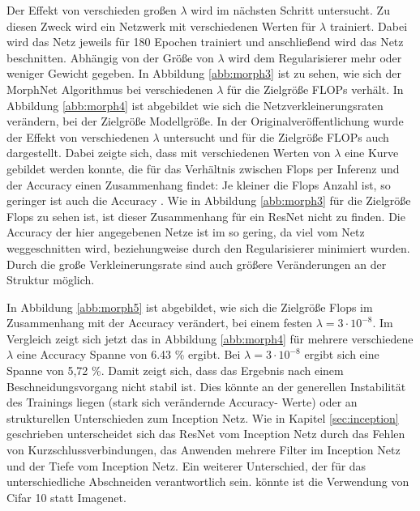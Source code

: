 Der Effekt von verschieden großen $\lambda$ wird im nächsten Schritt untersucht. Zu diesen Zweck wird ein Netzwerk mit verschiedenen Werten für $\lambda$ trainiert. Dabei wird das Netz jeweils für 180 Epochen trainiert und anschließend wird das Netz beschnitten. Abhängig von der Größe von $\lambda$ wird dem Regularisierer mehr oder weniger Gewicht gegeben. In Abbildung \ref{abb:morph3} ist zu sehen, wie sich der MorphNet Algorithmus bei verschiedenen $\lambda$ für die Zielgröße FLOPs verhält. In Abbildung \ref{abb:morph4} ist abgebildet wie sich die Netzverkleinerungsraten verändern, bei der Zielgröße Modellgröße. In der Originalveröffentlichung wurde der Effekt von verschiedenen $\lambda$ untersucht und für die Zielgröße FLOPs auch dargestellt. Dabei zeigte sich, dass mit verschiedenen Werten von $\lambda$ eine Kurve gebildet werden konnte, die für das Verhältnis zwischen Flops per Inferenz und der Accuracy einen Zusammenhang findet: Je kleiner die Flops Anzahl ist, so geringer ist auch die Accuracy \cite{morphnet}. Wie in Abbildung \ref{abb:morph3} für die Zielgröße Flops zu sehen ist, ist dieser Zusammenhang für ein ResNet nicht zu finden. Die Accuracy der hier angegebenen Netze ist im so gering, da viel vom Netz weggeschnitten wird, beziehungweise durch den Regularisierer minimiert wurden. Durch die große Verkleinerungsrate sind auch größere Veränderungen an der Struktur möglich.


In Abbildung \ref{abb:morph5} ist abgebildet, wie sich die Zielgröße Flops im Zusammenhang mit der Accuracy verändert, bei einem festen $\lambda = 3 \cdot 10^{-8}$. Im Vergleich zeigt sich jetzt das in Abbildung \ref{abb:morph4} für mehrere verschiedene $\lambda$ eine Accuracy Spanne von 6.43 \% ergibt. Bei $\lambda = 3 \cdot 10^{-8}$ ergibt sich eine Spanne von 5,72 \%. Damit zeigt sich, dass das Ergebnis nach einem Beschneidungsvorgang nicht stabil ist. Dies könnte an der generellen Instabilität des Trainings liegen (stark sich verändernde Accuracy- Werte) oder an strukturellen Unterschieden zum Inception Netz. Wie in Kapitel \ref{sec:inception} geschrieben unterscheidet sich das ResNet vom Inception Netz durch das Fehlen von Kurzschlussverbindungen, das Anwenden mehrere Filter im Inception Netz und der Tiefe vom Inception Netz. Ein weiterer Unterschied, der für das unterschiedliche Abschneiden verantwortlich sein. könnte ist die Verwendung von Cifar 10 statt Imagenet.


